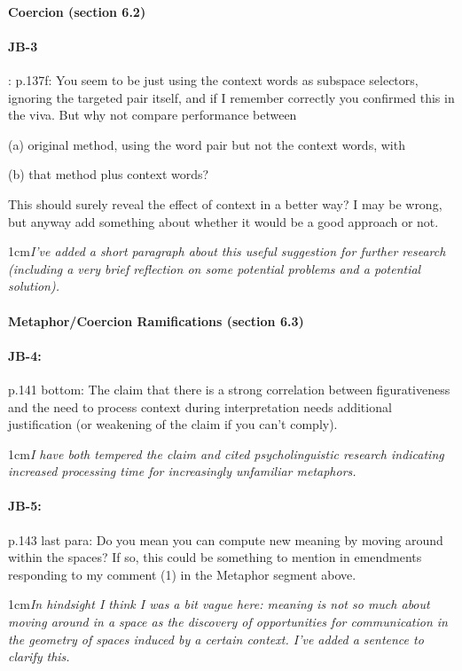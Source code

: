 \documentclass[11pt,a4paper]{article}
\newcommand{\res}[1]{\vspace{0.25cm} \begin{adjustwidth}{1cm}{}\emph{#1}\end{adjustwidth}}
\begin{document}
\paragraph{Coercion (section 6.2)}

\paragraph{JB-3}: p.137f: You seem to be just using the context words as subspace selectors, ignoring the targeted pair itself, and if I remember correctly you confirmed this in the viva. But why not compare performance between

(a) original method, using the word pair but not the context words, with

(b) that method plus context words?

This should surely reveal the effect of context in a better way? I may be wrong, but anyway add something about whether it would be a good approach or not.

\res{I've added a short paragraph about this useful suggestion for further research (including a very brief reflection on some potential problems and a potential solution).}


\paragraph{Metaphor/Coercion Ramifications (section 6.3)}

\paragraph{JB-4:} p.141 bottom: The claim that there is a strong correlation between figurativeness and the need to process context during interpretation needs additional justification (or weakening of the claim if you can't comply).

\res{I have both tempered the claim and cited psycholinguistic research indicating increased processing time for increasingly unfamiliar metaphors.}

\paragraph{JB-5:} p.143 last para: Do you mean you can compute new meaning by moving around within the spaces? If so, this could be something to mention in emendments responding to my comment (1) in the Metaphor segment above.

\res{In hindsight I think I was a bit vague here: meaning is not so much about moving around in a space as the discovery of opportunities for communication in the geometry of spaces induced by a certain context.  I've added a sentence to clarify this.}
\end{document}
